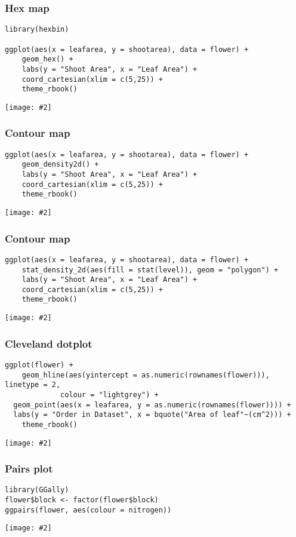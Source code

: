 \documentclass{beamer}
\newcommand{\fig}[2]{\centerline{\texttt{[image: \#2]}}}
\newcommand{\bfr}[1]{\begin{frame}[fragile]\frametitle{{ #1 }}}
\begin{document}
\bfr{Hex map}\scriptsize
\begin{verbatim}
library(hexbin)

ggplot(aes(x = leafarea, y = shootarea), data = flower) +
    geom_hex() +
    labs(y = "Shoot Area", x = "Leaf Area") +
    coord_cartesian(xlim = c(5,25)) +
    theme_rbook()
\end{verbatim}
\fig{0.7}{hex-1.png}
\end{frame}

\bfr{Contour map}\scriptsize
\begin{verbatim}
ggplot(aes(x = leafarea, y = shootarea), data = flower) +
    geom_density2d() +
    labs(y = "Shoot Area", x = "Leaf Area") +
    coord_cartesian(xlim = c(5,25)) +
    theme_rbook()
\end{verbatim}
\fig{0.7}{contour-1.png}
\end{frame}

\bfr{Contour map}\scriptsize
\begin{verbatim}
ggplot(aes(x = leafarea, y = shootarea), data = flower) +
    stat_density_2d(aes(fill = stat(level)), geom = "polygon") +
    labs(y = "Shoot Area", x = "Leaf Area") +
    coord_cartesian(xlim = c(5,25)) +
    theme_rbook()
\end{verbatim}
\fig{0.7}{stat-contour-1.png}
\end{frame}

\bfr{Cleveland dotplot}\scriptsize
\begin{verbatim}
ggplot(flower) + 
    geom_hline(aes(yintercept = as.numeric(rownames(flower))), linetype = 2,
             colour = "lightgrey") +
  geom_point(aes(x = leafarea, y = as.numeric(rownames(flower)))) +
  labs(y = "Order in Dataset", x = bquote("Area of leaf"~(cm^2))) +
    theme_rbook()
\end{verbatim}
\fig{0.7}{dotpot-1.png}
\end{frame}

\bfr{Pairs plot}\scriptsize
\vspace{-0.5cm}
\begin{verbatim}
library(GGally)
flower$block <- factor(flower$block)
ggpairs(flower, aes(colour = nitrogen))
\end{verbatim}
\fig{1.1}{pairs-plot-1.png}
\end{frame}
\end{document}
